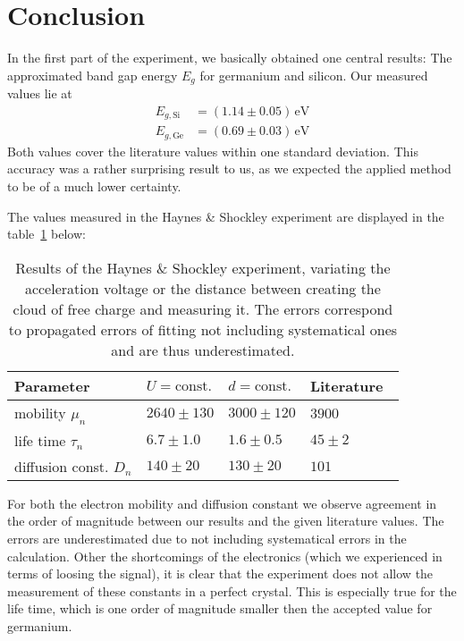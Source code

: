 \section{Conclusion}
In the first part of the experiment, we basically obtained one 
central results: The approximated band gap energy $E_g$ for germanium 
and silicon. Our measured values lie at 
\begin{align}
    E_{g, \mathrm{Si}} &= (1.14 \pm 0.05) \,\mathrm{eV} \\
    E_{g, \mathrm{Ge}} &= (0.69 \pm 0.03) \,\mathrm{eV}
\end{align}
Both values cover the literature values within one standard deviation.
This accuracy was a rather surprising result to us, as we expected the 
applied method to be of a much lower certainty. 

The values measured in the Haynes \& Shockley experiment 
are displayed in the table~\ref{tab:conc_h_s} below:
\renewcommand{\arraystretch}{1.5}
\begin{table}[H]
    \centering
    \caption{
        Results of the Haynes \& Shockley experiment, variating the 
        acceleration voltage or the distance between creating the 
        cloud of free charge and measuring it. The errors correspond 
        to propagated errors of fitting not including systematical ones 
        and are thus underestimated. 
        }
	\begin{tabular}{|p{4cm}|p{3cm}|p{3cm}|p{3cm}|}
		\hline
		\rowcolor{tabcolor}
		Parameter           & $U = \text{const.}$   & $d = \text{const.}$   & Literature~\cite{staatsexamen} \\ 
        \hline
        mobility $\mu_n$    & $2640 \pm 130$        & $3000 \pm 120$        & $3900$     \\
        life time $\tau_n$  & $6.7 \pm 1.0$         & $1.6 \pm 0.5$         & $45 \pm 2$ \\
        diffusion const. $D_n$ & $140 \pm 20$      & $130 \pm 20$          & $101$     \\
		\hline
	\end{tabular}
    \label{tab:conc_h_s}
\end{table}
For both the electron mobility and diffusion constant we observe agreement in the 
order of magnitude between our results and the given literature values. The 
errors are underestimated due to not including systematical errors in the calculation. 
Other the shortcomings of the electronics (which we experienced in terms 
of loosing the signal), it is clear that the experiment does not allow the 
measurement of these constants in a perfect crystal. This is especially 
true for the life time, which is one order of magnitude smaller then the 
accepted value for germanium. 

